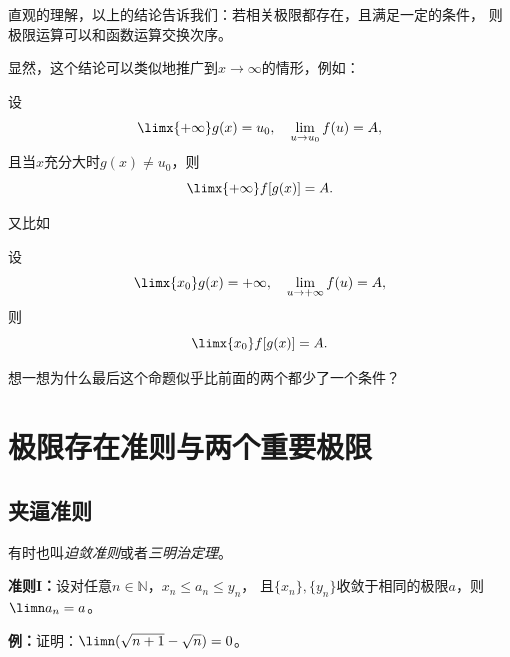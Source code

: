 直观的理解，以上的结论告诉我们：若相关极限都存在，且满足一定的条件，
则极限运算可以和函数运算交换次序。

显然，这个结论可以类似地推广到$x\to\infty$的情形，例如：

\begin{thx}
	设
	$$\limx{+\infty}g(x)=u_0,\quad\lim\limits_{u\to u_0}f(u)=A,$$
	且当$x$充分大时$g(x)\ne u_0$，则
	$$\limx{+\infty}f[g(x)]=A.$$
\end{thx}
又比如
\begin{thx}
	设
	$$\limx{x_0}g(x)=+\infty,\quad\lim\limits_{u\to+\infty}f(u)=A,$$
	则
	$$\limx{x_0}f[g(x)]=A.$$
\end{thx}
想一想为什么最后这个命题似乎比前面的两个都少了一个条件？

\section{极限存在准则与两个重要极限}

\subsection{夹逼准则}

有时也叫{\it 迫敛准则}或者{\it 三明治定理}。

\begin{thx}
	{\bf 准则I：}设对任意$n\in\mathbb{N}$，$x_n\le a_n\le y_n$，
	且$\{x_n\},\{y_n\}$收敛于相同的极限$a$，则$\limn a_n=a$。
\end{thx}

\begin{center}
\end{center}

{\bf 例：}证明：$\limn (\sqrt{n+1}-\sqrt{n})=0$。

